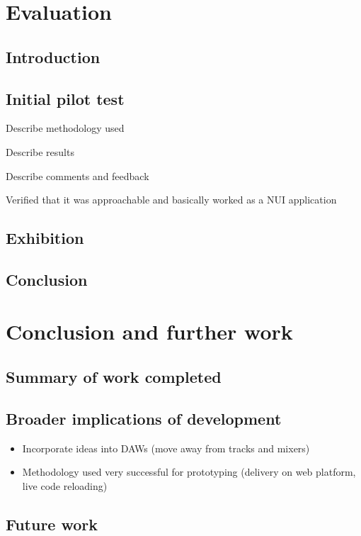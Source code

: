 \documentclass[a4paper,12pt]{article}
\begin{document}
\section{Evaluation}
\label{sec:orgc7754e3}
\subsection{Introduction}
\label{sec:orgb4c782f}
\subsection{Initial pilot test}
\label{sec:orgfd63fde}
\begin{description}
\item[{Introduction}] Describe methodology used
\item Describe results
\item Describe comments and feedback
\item Verified that it was approachable and basically worked as a NUI application
\end{description}
\subsection{Exhibition}
\label{sec:org5f9f7f4}
\subsection{Conclusion}
\label{sec:orge950425}

\section{Conclusion and further work}
\label{sec:org733257a}
\subsection{Summary of work completed}
\label{sec:org49fd10e}
\subsection{Broader implications of development}
\label{sec:orgfdd514d}
\begin{itemize}
\item Incorporate ideas into DAWs (move away from tracks and mixers)
\item Methodology used very successful for prototyping (delivery on web platform,
live code reloading)
\end{itemize}
\subsection{Future work}
\label{sec:orgb80f054}
\end{document}
